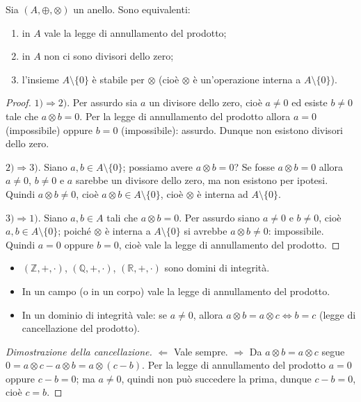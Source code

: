\documentclass[11pt,a4paper]{article}
\begin{document}
\begin{proposizione}
Sia $(A, \oplus, \otimes)$ un anello. Sono equivalenti:
\begin{enumerate}
  \item in $A$ vale la legge di annullamento del prodotto;
  \item in $A$ non ci sono divisori dello zero;
  \item l'insieme $A\setminus\{0\}$ è stabile per $\otimes$ (cioè $\otimes$ è un'operazione interna a $A\setminus\{0\}$).
\end{enumerate}
\end{proposizione}

\begin{proof}
$1) \Rightarrow 2)$. Per assurdo sia $a$ un divisore dello zero, cioè $a \neq 0$ ed esiste $b \neq 0$ tale che $a \otimes b = 0$. Per la legge di annullamento del prodotto allora $a = 0$ (impossibile) oppure $b = 0$ (impossibile): assurdo. Dunque non esistono divisori dello zero.

$2) \Rightarrow 3)$. Siano $a, b \in A\setminus\{0\}$; possiamo avere $a \otimes b = 0$? Se fosse $a \otimes b = 0$ allora $a \neq 0$, $b \neq 0$ e $a$ sarebbe un divisore dello zero, ma non esistono per ipotesi. Quindi $a \otimes b \neq 0$, cioè $a \otimes b \in A\setminus\{0\}$, cioè $\otimes$ è interna ad $A\setminus\{0\}$.

$3) \Rightarrow 1)$. Siano $a, b \in A$ tali che $a \otimes b = 0$. Per assurdo siano $a \neq 0$ e $b \neq 0$, cioè $a, b \in A\setminus\{0\}$; poiché $\otimes$ è interna a $A\setminus\{0\}$ si avrebbe $a \otimes b \neq 0$: impossibile. Quindi $a = 0$ oppure $b = 0$, cioè vale la legge di annullamento del prodotto.
\end{proof}

\begin{osservazione}
\begin{itemize}
  \item $(\mathbb{Z}, +, \cdot)$, $(\mathbb{Q}, +, \cdot)$, $(\mathbb{R}, +, \cdot)$ sono domini di integrità.
  \item In un campo (o in un corpo) vale la legge di annullamento del prodotto.
  \item In un dominio di integrità vale: se $a \neq 0$, allora $a \otimes b = a \otimes c \iff b = c$ (legge di cancellazione del prodotto).
\end{itemize}
\end{osservazione}

\begin{proof}[Dimostrazione della cancellazione]
$\Leftarrow$ Vale sempre. $\Rightarrow$ Da $a \otimes b = a \otimes c$ segue $0 = a \otimes c - a \otimes b = a \otimes (c - b)$. Per la legge di annullamento del prodotto $a = 0$ oppure $c - b = 0$; ma $a \neq 0$, quindi non può succedere la prima, dunque $c - b = 0$, cioè $c = b$.
\end{proof}
\end{document}
